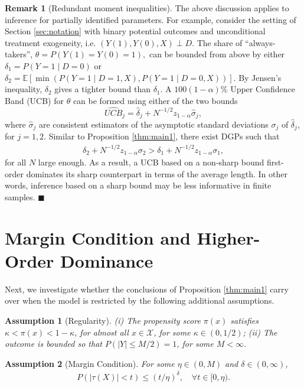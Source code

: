 \documentclass[12pt]{article}
\numberwithin{equation}{section}
\theoremstyle{plain}                         %
\newtheorem{assumption}{Assumption}[section]
\theoremstyle{definition}                  %
\newtheorem{remark}{Remark}
\theoremstyle{remark}                      %
\newcommand{\E}{\mathbb{E}}
\renewcommand{\qed}{\hfill$\blacksquare$}
\begin{document}
\begin{remark}[Redundant moment inequalities]
\label{rm:vanish2}
The above discussion applies to inference for partially identified parameters. For example, consider the setting of Section \ref{sec:notation} with binary potential outcomes and unconditional treatment exogeneity, i.e. $(Y(1), Y(0), X) \perp D$. The share of ``always-takers'', $\theta=P(Y(1) = Y(0) = 1),$
can be bounded from above by either $\delta_1 = P(Y=1 \mid D=0)$ or $\delta_2 = \E [\min (P(Y=1 \mid D=1,X), P(Y=1 \mid D=0,X))]$. By Jensen's inequality, $\delta_2$ gives a tighter bound than $\delta_1$. A $100(1-\alpha) \%$ Upper Confidence Band (UCB) for $\theta$ can be formed using either of the two bounds
$$
\widehat{UCB}_j = \widehat{\delta}_j + N^{-1/2} z_{1-\alpha} \widehat{\sigma}_j,
$$
where $\widehat \sigma_j$ are consistent estimators of the asymptotic standard deviations $\sigma_j$ of $\hat{\delta}_j$, for $j = 1, 2$. Similar to Proposition \ref{thm:main1}, there exist DGPs such that
\begin{align}
\label{eq:mainstatement3}
\delta_2+N^{-1/2} z_{1-\alpha} \sigma_2>\delta_1+N^{-1/2} z_{1-\alpha} \sigma_1,
\end{align}
for all $N$ large enough. As a result, a UCB based on a non-sharp bound first-order dominates its sharp counterpart in terms of the average length. In other words, inference based on a sharp bound may be less informative in finite samples. \qed 
\end{remark}



\section{Margin Condition and Higher-Order Dominance}
\label{sec:mainr2}

Next, we investigate whether the conclusions of Proposition \ref{thm:main1} carry over when the model is restricted by the following additional assumptions.  
  
\begin{assumption}[Regularity]
\label{ass:overlap}
(i) The propensity score $\pi(x)$ satisfies $\kappa < \pi(x) < 1-\kappa$, for almost all $x \in \mathcal{X}$, for some $\kappa \in (0, 1/2)$; (ii) The outcome is bounded so that $P (|Y| \leq M/2) = 1$, for some $M < \infty$.  
\end{assumption}


\begin{assumption}[Margin Condition]
\label{ass:margin}
For some  $\eta \in (0,M)$  and $\delta \in (0,\infty)$, 
\begin{align}
\label{eq:margin}
P(|\tau(X)| < t) \leq  (t/\eta)^{\delta}, \quad \forall t \in [0, \eta).
\end{align}
\end{assumption}
\end{document}

